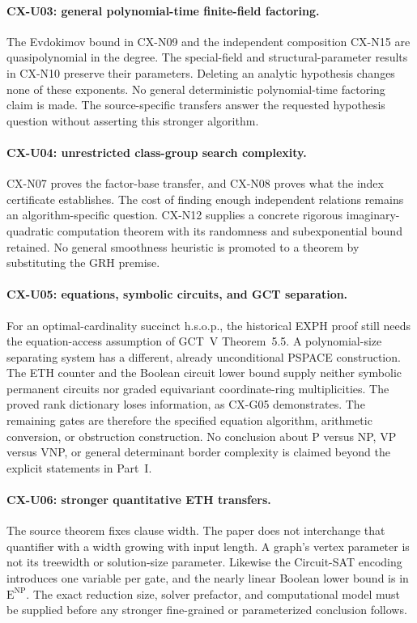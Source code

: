 \documentclass[11pt,a4paper]{article}
\begin{document}
\paragraph{CX-U03: general polynomial-time finite-field factoring.}
The Evdokimov bound in CX-N09 and the independent composition CX-N15
are quasipolynomial in the degree.
The special-field and structural-parameter results in CX-N10 preserve
their parameters. Deleting an analytic hypothesis changes none of
these exponents. No general deterministic polynomial-time factoring
claim is made. The source-specific transfers answer the requested
hypothesis question without asserting this stronger algorithm.

\paragraph{CX-U04: unrestricted class-group search complexity.}
CX-N07 proves the factor-base transfer, and CX-N08 proves what the
index certificate establishes. The cost of finding enough independent
relations remains an algorithm-specific question. CX-N12 supplies a
concrete rigorous imaginary-quadratic computation theorem with its
randomness and subexponential bound retained. No general smoothness
heuristic is promoted to a theorem by substituting the GRH premise.

\paragraph{CX-U05: equations, symbolic circuits, and GCT separation.}
For an optimal-cardinality succinct h.s.o.p., the historical EXPH
proof still needs the equation-access assumption of GCT~V
Theorem~5.5. A polynomial-size separating system has a different,
already unconditional PSPACE construction. The ETH counter and the
Boolean circuit lower bound supply neither symbolic permanent
circuits nor graded equivariant coordinate-ring multiplicities.
The proved rank dictionary loses information, as CX-G05 demonstrates.
The remaining gates are therefore the specified equation algorithm,
arithmetic conversion, or obstruction construction. No conclusion
about P versus NP, VP versus VNP, or general determinant border
complexity is claimed beyond the explicit statements in Part~I.

\paragraph{CX-U06: stronger quantitative ETH transfers.}
The source theorem fixes clause width. The paper does not interchange
that quantifier with a width growing with input length. A graph's
vertex parameter is not its treewidth or solution-size parameter.
Likewise the Circuit-SAT encoding introduces one variable per gate,
and the nearly linear Boolean lower bound is in
$\mathrm E^{\mathrm{NP}}$. The exact reduction size, solver prefactor,
and computational model must be supplied before any stronger
fine-grained or parameterized conclusion follows.
\end{document}

